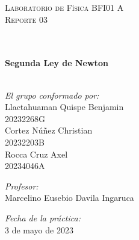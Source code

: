 \documentclass[10pt]{article}
\begin{document}
\begin{center}
\begin{minipage}{0.9\textwidth} 
\begin{center}																					%
\textsc{\LARGE  Laboratorio de Física BFI01 A\\[0.7cm] Reporte 03}
\end{center}
\end{minipage}\\[0.3cm]
 			\vspace*{0.4cm}																		%
\HRule \\[0.5cm]																	%
{ \huge \bfseries Segunda Ley de Newton}\\[0.2cm]	%
\HRule \\[0.9cm]																	%
\begin{minipage}{0.46\textwidth}													%
\begin{flushleft} \large															%

\emph{El grupo conformado por:}\\[2mm]
Llactahuaman Quispe Benjamin\\20232268G \\[1mm]
Cortez Núñez Christian\\20232203B\\[1mm]
Rocca Cruz Axel\\20234046A\\[1mm]
 

\end{flushleft}																		%
\end{minipage}		
\begin{minipage}{0.52\textwidth}		
\vspace{-2.6cm}											%
\begin{flushright} \large															%
\emph{Profesor:}\\[2mm]																	%
 Marcelino Eusebio Davila Ingaruca\\
\end{flushright}																	%
\end{minipage}	
\vspace*{1cm}
 	
\vspace{-3.3cm}	
\begin{flushright}	
\large
\emph{Fecha de la práctica:}\\
\vspace{0.1cm}
3 de mayo de 2023
\end{flushright}
 \vspace{2.7cm}


\end{center}
\end{document}
